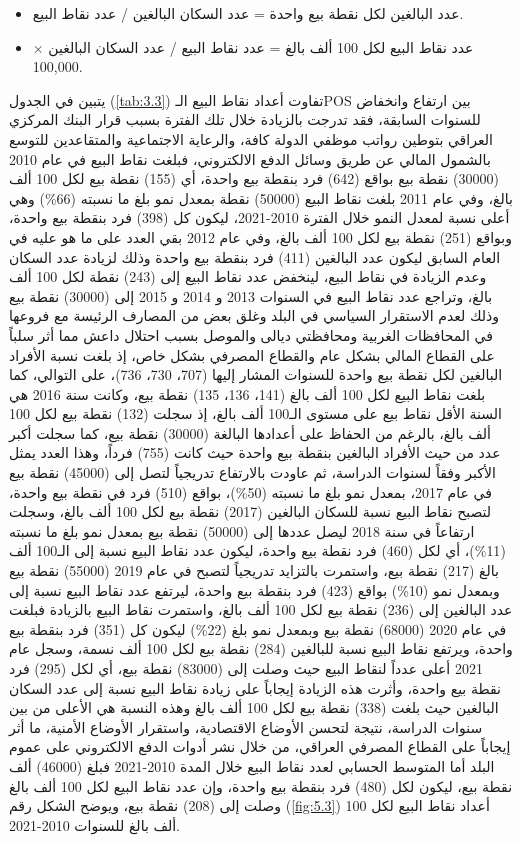 \documentclass[10pt,a4paper]{report}
\begin{document}
\begin{doublespacing}
\begin{itemize}
	\item عدد البالغين لكل نقطة بيع واحدة = عدد السكان البالغين / عدد نقاط البيع.
	\item عدد نقاط البيع لكل 100 ألف بالغ = عدد نقاط البيع / عدد السكان البالغين $\times$ 100,000.
\end{itemize}
يتبين في الجدول (\ref{tab:3.3}) تفاوت أعداد نقاط البيع الـPOS بين ارتفاع وانخفاض للسنوات السابقة، فقد تدرجت بالزيادة خلال تلك الفترة بسبب قرار البنك المركزي العراقي بتوطين رواتب موظفي الدولة كافة، والرعاية الاجتماعية والمتقاعدين للتوسع بالشمول المالي عن طريق وسائل الدفع الالكتروني، فبلغت نقاط البيع في عام 2010 (30000) نقطة بيع بواقع (642) فرد بنقطة بيع واحدة، أي (155) نقطة بيع لكل 100 ألف بالغ، وفي عام 2011 بلغت نقاط البيع (50000) نقطة بمعدل نمو بلغ ما نسبته (66\%) وهي أعلى نسبة لمعدل النمو خلال الفترة 2010-2021، ليكون كل (398) فرد بنقطة بيع واحدة، وبواقع (251) نقطة بيع لكل 100 ألف بالغ، وفي عام 2012 بقي العدد على ما هو عليه في العام السابق ليكون عدد البالغين (411) فرد بنقطة بيع واحدة وذلك لزيادة عدد السكان وعدم الزيادة في نقاط البيع، لينخفض عدد نقاط البيع إلى (243) نقطة لكل 100 ألف بالغ، وتراجع عدد نقاط البيع في السنوات 2013 و 2014 و 2015 إلى (30000) نقطة بيع وذلك لعدم الاستقرار السياسي في البلد وغلق بعض من المصارف الرئيسة مع فروعها في المحافظات الغربية ومحافظتي ديالى والموصل بسبب احتلال داعش مما أثر سلباً على القطاع المالي بشكل عام والقطاع المصرفي بشكل خاص، إذ بلغت نسبة الأفراد البالغين لكل نقطة بيع واحدة للسنوات المشار إليها (707، 730، 736)، على التوالي، كما بلغت نقاط البيع لكل 100 ألف بالغ (141، 136، 135) نقطة بيع، وكانت سنة 2016 هي السنة الأقل نقاط بيع على مستوى الـ100 ألف بالغ، إذ سجلت (132) نقطة بيع لكل 100 ألف بالغ، بالرغم من الحفاظ على أعدادها البالغة (30000) نقطة بيع، كما سجلت أكبر عدد من حيث الأفراد البالغين بنقطة بيع واحدة حيث كانت (755) فرداً، وهذا العدد يمثل الأكبر وفقاً لسنوات الدراسة، ثم عاودت بالارتفاع تدريجياً لتصل إلى (45000) نقطة بيع في عام 2017، بمعدل نمو بلغ ما نسبته (50\%)، بواقع (510) فرد في نقطة بيع واحدة، لتصبح نقاط البيع نسبة للسكان البالغين (2017) نقطة بيع لكل 100 ألف بالغ، وسجلت ارتفاعاً في سنة 2018 ليصل عددها إلى (50000) نقطة بيع بمعدل نمو بلغ ما نسبته (11\%)، أي لكل (460) فرد نقطة بيع واحدة، ليكون عدد نقاط البيع نسبة إلى الـ100 ألف بالغ (217) نقطة بيع، واستمرت بالتزايد تدريجياً لتصبح في عام 2019 (55000) نقطة بيع وبمعدل نمو (10\%) بواقع (423) فرد بنقطة بيع واحدة، ليرتفع عدد نقاط البيع نسبة إلى عدد البالغين إلى (236) نقطة بيع لكل 100 ألف بالغ، واستمرت نقاط البيع بالزيادة فبلغت في عام 2020 (68000) نقطة بيع وبمعدل نمو بلغ (22\%) ليكون كل (351) فرد بنقطة بيع واحدة، ويرتفع نقاط البيع نسبة للبالغين (284) نقطة بيع لكل 100 ألف نسمة، وسجل عام 2021 أعلى عدداً لنقاط البيع حيث وصلت إلى (83000) نقطة بيع، أي لكل (295) فرد نقطة بيع واحدة، وأثرت هذه الزيادة إيجاباً على زيادة نقاط البيع نسبة إلى عدد السكان البالغين حيث بلغت (338) نقطة بيع لكل 100 ألف بالغ وهذه النسبة هي الأعلى من بين سنوات الدراسة، نتيجة لتحسن الأوضاع الاقتصادية، واستقرار الأوضاع الأمنية، ما أثر إيجاباً على القطاع المصرفي العراقي، من خلال نشر أدوات الدفع الالكتروني على عموم البلد أما المتوسط الحسابي لعدد نقاط البيع خلال المدة 2010-2021 فبلغ (46000) ألف نقطة بيع، ليكون لكل (480) فرد بنقطة بيع واحدة، وإن عدد نقاط البيع لكل 100 ألف بالغ وصلت إلى (208) نقطة بيع، ويوضح الشكل رقم (\ref{fig:5.3}) أعداد نقاط البيع لكل 100 ألف بالغ للسنوات 2010-2021.

\end{doublespacing}
\end{document}
